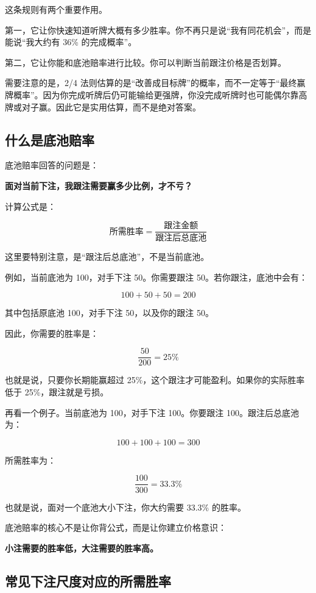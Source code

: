 这条规则有两个重要作用。

第一，它让你快速知道听牌大概有多少胜率。你不再只是说“我有同花机会”，而是能说“我大约有 36\% 的完成概率”。

第二，它让你能和底池赔率进行比较。你可以判断当前跟注价格是否划算。

需要注意的是，2/4 法则估算的是“改善成目标牌”的概率，而不一定等于“最终赢牌概率”。因为你完成听牌后仍可能输给更强牌，你没完成听牌时也可能偶尔靠高牌或对子赢。因此它是实用估算，而不是绝对答案。

\subsection{什么是底池赔率}

底池赔率回答的问题是：

\begin{center}
\textbf{面对当前下注，我跟注需要赢多少比例，才不亏？}
\end{center}

计算公式是：

\[
\text{所需胜率} =
\frac{\text{跟注金额}}{\text{跟注后总底池}}
\]

这里要特别注意，是“跟注后总底池”，不是当前底池。

例如，当前底池为 100，对手下注 50。你需要跟注 50。若你跟注，底池中会有：

\[
100 + 50 + 50 = 200
\]

其中包括原底池 100，对手下注 50，以及你的跟注 50。

因此，你需要的胜率是：

\[
\frac{50}{200} = 25\%
\]

也就是说，只要你长期能赢超过 25\%，这个跟注才可能盈利。如果你的实际胜率低于 25\%，跟注就是亏损。

再看一个例子。当前底池为 100，对手下注 100。你要跟注 100。跟注后总底池为：

\[
100 + 100 + 100 = 300
\]

所需胜率为：

\[
\frac{100}{300} = 33.3\%
\]

也就是说，面对一个底池大小下注，你大约需要 33.3\% 的胜率。

底池赔率的核心不是让你背公式，而是让你建立价格意识：

\begin{center}
\textbf{小注需要的胜率低，大注需要的胜率高。}
\end{center}

\subsection{常见下注尺度对应的所需胜率}

